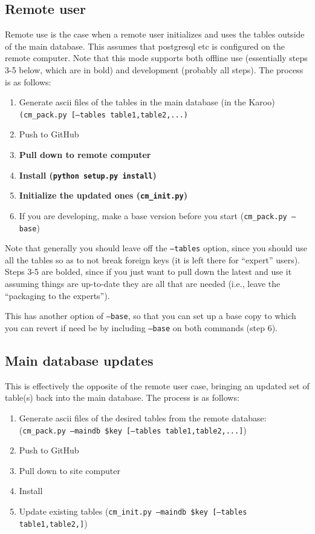 \documentclass{article}[10pt]
\begin{document}
\subsection{Remote user}
Remote use is the case when a remote user initializes and uses the tables outside of the main database.  This assumes that postgresql etc is configured on the remote computer.  Note that this mode supports both offline use (essentially steps 3-5 below, which are in bold) and development (probably all steps).  The process is as follows: 
\begin{enumerate}\setlength\itemsep{-.3em}
	\item Generate ascii files of the tables in the main database (in the Karoo) {\tt (cm\_pack.py [--tables table1,table2,...)}
	\item Push to GitHub
	\item {\bf Pull down to remote computer}
	\item {\bf Install ({\tt python setup.py install})}
	\item {\bf Initialize the updated ones ({\tt cm\_init.py})}
	\item If you are developing, make a base version before you start ({\tt cm\_pack.py --base})
\end{enumerate}

Note that generally you should leave off the {\tt --tables} option, since you should use all the tables so as to not break foreign keys (it is left there for ``expert'' users).  Steps 3-5 are bolded, since if you just want to pull down the latest and use it assuming things are up-to-date they are all that are needed (i.e., leave the ``packaging to the experts'').

This has another option of {\tt --base}, so that you can set up a base copy to which you can revert if need be by including {\tt --base} on both commands (step 6).
	
\subsection{Main database updates}
This is effectively the opposite of the remote user case, bringing an updated set of table(s) back into the main database.  The process is as follows:
\begin{enumerate}\setlength\itemsep{-.3em}
	\item  Generate ascii files of the desired tables from the remote database: 
		({\tt cm\_pack.py --maindb \$key [--tables table1,table2,...]})
	\item Push to GitHub
	\item Pull down to site computer
	\item Install
	\item Update existing tables  ({\tt cm\_init.py --maindb \$key [--tables table1,table2,]})
\end{enumerate}
\end{document}
